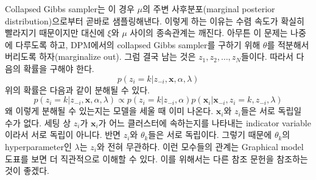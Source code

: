 \documentclass[a4paper, 10pt]{book}
\newtheorem{thm}{Theorem}[section]
\newcommand{\bs}{\boldsymbol}
\begin{document}
  Collapsed Gibbs sampler는 이 경우 $\mu$의 주변 사후분포(marginal posterior distribution)으로부터 곧바로 샘플링해낸다. 이렇게 하는 이유는 수렴 속도가 확실히 빨라지기 때문이지만 대신에 $\xi$와 $\mu$ 사이의 종속관계는 깨진다. 아무튼 이 문제는 나중에 다루도록 하고, DPM에서의 collapsed Gibbs sampler를 구하기 위해 $\theta$를 적분해서 버리도록 하자(marginalize out). 그럼 결국 남는 것은 $z_{1}, z_{2}, \ldots , z_{N}$들이다. 따라서 다음의 확률을 구해야 한다.
  \begin{equation}
    p\left(z_{i}=k|z_{-i}, \bs{x}, \alpha, \lambda\right)
  \end{equation}
  위의 확률은 다음과 같이 분해될 수 있다.
  \begin{equation}
    p\left(z_{i}=k|z_{-i}, \bs{x}, \alpha, \lambda\right) \propto p\left(z_{i}=k|z_{-i}, \alpha\right)p\left(\bs{x}_{i}|\bs{x}_{-i}, z_{i}=k, z_{-i}, \lambda\right)
  \end{equation}
  왜 이렇게 분해될 수 있는지는 모델을 세울 때 이미 나온다. $\bs{x}_{i}$와 $z_{i}$들은 서로 독립일 수가 없다. 세팅 상 $z_{i}$가 $\bs{x}_{i}$가 어느 클러스터에 속하는지를 나타내는 indicator variable이라서 서로 독립이 아니다. 반면 $z_{i}$와 $\theta_{k}$들은 서로 독립이다. 그렇기 때문에 $\theta_{k}$의 hyperparameter인 $\lambda$는 $z_{i}$와 전혀 무관하다. 이런 모수들의 관계는 Graphical model 도표를 보면 더 직관적으로 이해할 수 있다. 이를 위해서는 다른 참조 문헌을 참조하는 것이 좋겠다.
  
\end{document}
